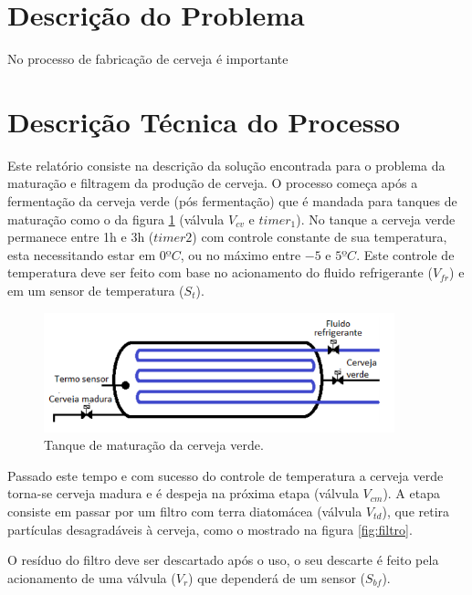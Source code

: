\documentclass[12pt]{article}
\begin{document}
	
	
	\tableofcontents
	\listoffigures
	\listoftables
	
	\clearpage
	
	\section{Descrição do Problema}
	No processo de fabricação de cerveja é importante 
	
	\section{Descrição Técnica do Processo}
	
	Este relatório consiste na descrição da solução encontrada para o problema da maturação e filtragem da produção de cerveja. O processo começa após a fermentação da cerveja verde (pós fermentação) que é mandada para tanques de maturação como o da figura \ref{fig:maturador} (válvula $V_{cv}$ e $timer_1$). No tanque a cerveja verde permanece entre 1h e 3h ($timer2$) com controle constante de sua temperatura, esta necessitando estar em $0ºC$, ou no máximo entre $-5$ e $5ºC$. Este controle de temperatura deve ser feito com base no acionamento do fluido refrigerante ($V_{fr}$) e em um sensor de temperatura ($S_t$).
	
	\begin{figure}[H]
		\centering
		\includegraphics [width=4in]{tanque.png}
		\caption {Tanque de maturação da cerveja verde.}
		\label{fig:maturador}
	\end{figure}
	
	Passado este tempo e com sucesso do controle de temperatura a cerveja verde torna-se cerveja madura e é despeja na próxima etapa (válvula $V_{cm}$). A etapa consiste em passar por um filtro com terra diatomácea (válvula $V_{td}$), que retira partículas desagradáveis à cerveja, como o mostrado na figura \ref{fig:filtro}. 
	
	O resíduo do filtro deve ser descartado após o uso, o seu descarte é feito pela acionamento de uma válvula ($V_r$) que dependerá de um sensor ($S_{bf}$).
	
\end{document}
